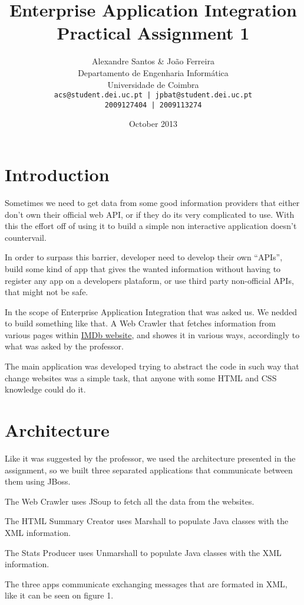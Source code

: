\documentclass[a4paper]{article}
\title{Enterprise Application Integration \\ Practical Assignment 1}
\author{Alexandre Santos \& João Ferreira\\
		Departamento de Engenharia Informática\\
		Universidade de Coimbra\\
		\texttt{acs@student.dei.uc.pt | jpbat@student.dei.uc.pt}\\
		\texttt{2009127404 | 2009113274}}
\date{October 2013}
\begin{document}
\maketitle
\clearpage

\tableofcontents

\setlength{\parindent}{1cm}
\setlength{\parskip}{0.3cm}

\clearpage
\section{Introduction}
\indent \indent Sometimes we need to get data from some good information providers that either don't own their official web API, or if they do its very complicated to use. With this the effort off of using it to build a simple non interactive application doesn't countervail.

In order to surpass this barrier, developer need to develop their own ``APIs'', build some kind of app that gives the wanted information without having to register any app on a developers plataform, or use third party non-official APIs, that might not be safe.

In the scope of Enterprise Application Integration that was asked us. We nedded to build something like that. A Web Crawler that fetches information from various pages within \href{http://www.imdb.com}{IMDb website}, and showes it in various ways, accordingly to what was asked by the professor.

The main application was developed trying to abstract the code in such way that change websites was a simple task, that anyone with some HTML and CSS knowledge could do it.

\clearpage
\section{Architecture}
\indent \indent Like it was suggested by the professor, we used the architecture presented in the assignment, so we built three separated applications that communicate between them using JBoss.

The Web Crawler uses JSoup to fetch all the data from the websites.

The HTML Summary Creator uses Marshall to populate Java classes with the XML information.

The Stats Producer uses Unmarshall to populate Java classes with the XML information.

The three apps communicate exchanging messages that are formated in XML, like it can be seen on figure 1.
\end{document}

